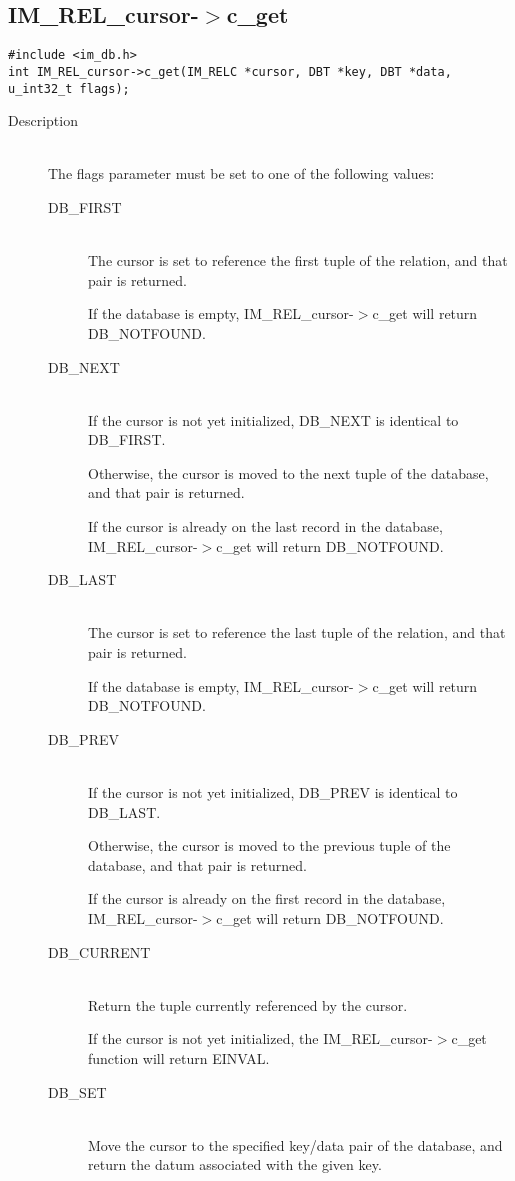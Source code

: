 \documentclass[11pt]{article}
\def\cdf{\sf }
\def\cdf{\sf }
\newcommand{\IMRELcursor}{{\small{\cdf IM\_REL\_cursor}}}
\newcommand{\DBNOTFOUND}{{\small{\cdf DB\_NOTFOUND}}}
\newcommand{\DBFIRST}{{\small{\cdf DB\_FIRST}}}
\newcommand{\DBNEXT}{{\small{\cdf DB\_NEXT}}}
\newcommand{\DBLAST}{{\small{\cdf DB\_LAST}}}
\newcommand{\DBPREV}{{\small{\cdf DB\_PREV}}}
\newcommand{\DBCURRENT}{{\small{\cdf DB\_CURRENT}}}
\newcommand{\DBSET}{{\small{\cdf DB\_SET}}}
\begin{document}
\subsection{{\IMRELcursor}-$>$c\_get}
\begin{verbatim}
#include <im_db.h>
int IM_REL_cursor->c_get(IM_RELC *cursor, DBT *key, DBT *data, u_int32_t flags);
\end{verbatim}
\begin{description}
\item[Description]\ \\

  The flags parameter must be set to one of the following values: 
  \begin{description}
  \item[{\DBFIRST}]\ \\
    The cursor is set to reference the first tuple of the relation,
    and that pair is returned.

    If the database is empty, {\IMRELcursor}-$>$c\_get will return
    {\DBNOTFOUND}.
  \item[{\DBNEXT}]\ \\
    If the cursor is not yet initialized, {\DBNEXT} is identical to
    {\DBFIRST}.

    Otherwise, the cursor is moved to the next tuple of the database,
    and that pair is returned.

    If the cursor is already on the last record in the database,
    {\IMRELcursor}-$>$c\_get will return {\DBNOTFOUND}.
  \item[{\DBLAST}]\ \\
    The cursor is set to reference the last tuple of the relation,
    and that pair is returned.

    If the database is empty, {\IMRELcursor}-$>$c\_get will return
    {\DBNOTFOUND}.
  \item[{\DBPREV}]\ \\
    If the cursor is not yet initialized, {\DBPREV} is identical to
    {\DBLAST}.

    Otherwise, the cursor is moved to the previous tuple of the database,
    and that pair is returned.

    If the cursor is already on the first record in the database,
    {\IMRELcursor}-$>$c\_get will return {\DBNOTFOUND}.
  \item[{\DBCURRENT}]\ \\
    Return the tuple currently referenced by the cursor. 

    If the cursor is not yet initialized, the {\IMRELcursor}-$>$c\_get function
    will return EINVAL.
  \item[{\DBSET}]\ \\
    Move the cursor to the specified key/data pair of the database,
    and return the datum associated with the given key. 


\end{description}
\end{description}
\end{document}
